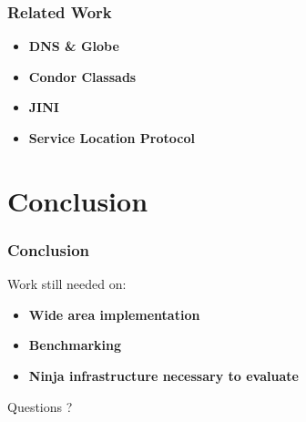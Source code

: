 \documentclass{beamer}
\begin{document}
\begin{frame}[fragile] %
\frametitle{Related Work}
\begin{itemize}
\item {\bf DNS \& Globe}
\item {\bf Condor Classads}
\item {\bf JINI}
\item {\bf Service Location Protocol}
\end{itemize}
\end{frame}


\section{Conclusion}
\begin{frame}[fragile] %
\frametitle{Conclusion}
Work still needed on: 
\begin{itemize}
\item {\bf Wide area implementation }
\item {\bf Benchmarking }
\item {\bf Ninja infrastructure necessary to evaluate}
\end{itemize}
\end{frame}


\begin{frame}
\Huge{\centerline{Questions ?}}
\end{frame}

\end{document}
